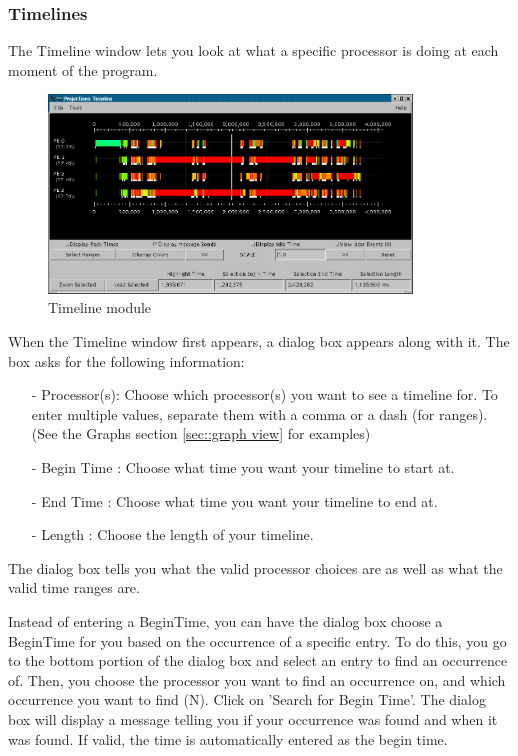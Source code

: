 \documentclass[10pt]{article}
\begin{document}
\subsubsection{Timelines}
\label{sec::timeline view}
The Timeline window lets you look at what a specific processor is
doing at each moment of the program.

\begin{figure}[htb]
\center
\includegraphics[width=3.8in]{fig/timeline}
\caption{Timeline module}
\label{timeline}
\end{figure}

When the Timeline window first appears, a dialog box appears along
with it. The box asks for the following information:

\begin{itemize}
\item[-]
Processor(s): Choose which processor(s) you want to see a timeline
for. To enter multiple values, separate them with a comma or a dash
(for ranges). (See the Graphs section \ref{sec::graph view} for 
examples)
\item[-]
Begin Time  : Choose what time you want your timeline to start at.
\item[-]
End Time    : Choose what time you want your timeline to end at.
\item[-]
Length      : Choose the length of your timeline.
\end{itemize}

The dialog box tells you what the valid processor choices are as well as what
the valid time ranges are.

Instead of entering a BeginTime, you can have the dialog box choose a
BeginTime for you based on the occurrence of a specific entry.  To do
this, you go to the bottom portion of the dialog box and select an
entry to find an occurrence of.  Then, you choose the processor you
want to find an occurrence on, and which occurrence you want to find
(N). Click on 'Search for Begin Time'.  The dialog box will display a
message telling you if your occurrence was found and when it was
found. If valid, the time is automatically entered as the begin time.
\end{document}
